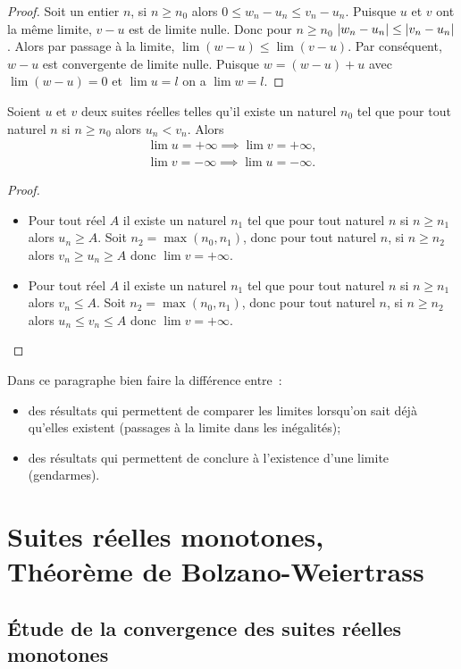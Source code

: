 \begin{proof}
  Soit un entier $n$, si $n \geq n_0$ alors $0 \leq w_n-u_n \leq v_n -u_n$. Puisque $u$ et $v$ ont la même limite, $v-u$ est de limite nulle. Donc pour $n \geq n_0$ $\left\lvert w_n-u_n\right\rvert \leq \left\lvert v_n-u_n\right\rvert$. Alors par passage à la limite, $\lim (w-u) \leq \lim (v-u)$. Par conséquent, $w-u$ est convergente de limite nulle. Puisque $w=(w-u)+u$ avec $\lim (w-u)=0$ et $\lim u=l$ on a $\lim w =l$.
\end{proof}
\begin{prop}
  Soient $u$ et $v$ deux suites réelles telles qu'il existe un naturel $n_0$ tel que pour tout naturel $n$ si $n \geq n_0$ alors $u_n<v_n$. Alors
  \begin{gather}
    \lim u =+\infty \implies \lim v =+\infty,\\
    \lim v =-\infty \implies \lim u =-\infty.
  \end{gather}
\end{prop}
\begin{proof}
  \begin{itemize}
  \item Pour tout réel $A$ il existe un naturel $n_1$ tel que pour tout naturel $n$ si $n \geq n_1$ alors $u_n \geq A$. Soit $n_2=\max(n_0,n_1)$, donc pour tout naturel $n$, si $n \geq n_2$ alors $v_n \geq u_n \geq A$ donc $\lim v=+\infty$.
  \item Pour tout réel $A$ il existe un naturel $n_1$ tel que pour tout naturel $n$ si $n \geq n_1$ alors $v_n \leq A$. Soit $n_2=\max(n_0,n_1)$, donc pour tout naturel $n$, si $n \geq n_2$ alors $u_n \leq v_n \leq A$ donc $\lim v=+\infty$.
  \end{itemize}
\end{proof}
Dans ce paragraphe bien faire la différence entre~:
\begin{itemize}
\item des résultats qui permettent de comparer les limites lorsqu'on sait déjà qu'elles existent (passages à la limite dans les inégalités);
\item des résultats qui permettent de conclure à l'existence d'une limite (gendarmes).
\end{itemize}

\section{Suites réelles monotones, Théorème de Bolzano-Weiertrass}

\subsection{Étude de la convergence des suites réelles monotones}

